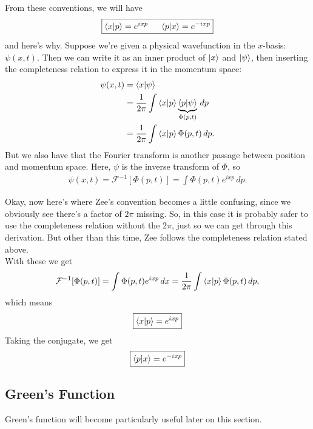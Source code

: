\documentclass{book}
\theoremstyle{definition}
\newcommand{\f}[2]{\frac{#1}{#2}}
\begin{document}
From these conventions, we will have
\begin{align}
\boxed{\braket{x}{p} = e^{ixp} \hspace{0.5cm} \braket{p}{x} = e^{-ixp}}
\end{align}
and here's why. Suppose we're given a physical wavefunction in the $x$-basis: $\psi(x,t)$. Then we can write it as an inner product of $\ket{x}$ and $\ket{\psi}$, then inserting the completeness relation to express it in the momentum space:
\begin{align}
\psi(x,t) &= \braket{x}{\psi}\\
&= \f{1}{2\pi}\int \bra{x}\ket{p}\underbrace{\bra{p}\ket{\psi}}_{\Phi(p,t)}\,dp\\
&= \f{1}{2\pi}\int \bra{x}\ket{p} \Phi(p,t)\,dp.
\end{align}
But we also have that the Fourier transform is another passage between position and momentum space. Here, $\psi$ is the inverse transform of $\Phi$, so
\begin{align}
\psi(x,t) = \mathcal{F}^{-1}[\Phi(p,t)] = \int \Phi(p,t)e^{ixp}\,dp.
\end{align}


Okay, now here's where Zee's convention becomes a little confusing, since we obviously see there's a factor of $2\pi$ missing. So, in this case it is probably safer to use the completeness relation without the $2\pi$, just so we can get through this derivation. But other than this time, Zee follows the completeness relation stated above. \\

With these we get
\begin{align}
\mathcal{F}^{-1}[\Phi(p,t)] = \int \Phi(p,t)e^{ixp}\,dx = \f{1}{2\pi}\int \bra{x}\ket{p} \Phi(p,t)\,dp,
\end{align} 
which means
\begin{align}
\boxed{\braket{x}{p} = e^{ixp}}
\end{align}
Taking the conjugate, we get
\begin{align}
\boxed{\braket{p}{x} = e^{-ixp}}
\end{align}


\subsection{Green's Function}



Green's function will become particularly useful later on this section.\\
\end{document}
